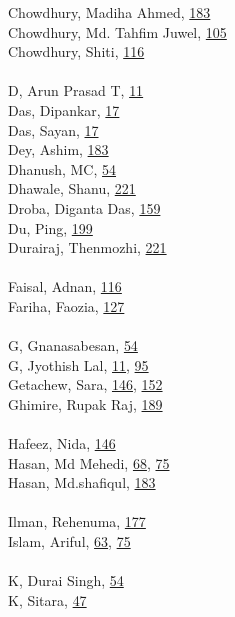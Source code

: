 \documentclass[11pt,oneside]{book}
\begin{document}
\begin{multicols}{2}
Chowdhury, Madiha Ahmed, \hyperlink{page.183}{183}\\
Chowdhury, Md. Tahfim Juwel, \hyperlink{page.105}{105}\\
Chowdhury, Shiti, \hyperlink{page.116}{116}\\
\\ %
D, Arun Prasad T, \hyperlink{page.11}{11}\\
Das, Dipankar, \hyperlink{page.17}{17}\\
Das, Sayan, \hyperlink{page.17}{17}\\
Dey, Ashim, \hyperlink{page.183}{183}\\
Dhanush, MC, \hyperlink{page.54}{54}\\
Dhawale, Shanu, \hyperlink{page.221}{221}\\
Droba, Diganta Das, \hyperlink{page.159}{159}\\
Du, Ping, \hyperlink{page.199}{199}\\
Durairaj, Thenmozhi, \hyperlink{page.221}{221}\\
\\ %
Faisal, Adnan, \hyperlink{page.116}{116}\\
Fariha, Faozia, \hyperlink{page.127}{127}\\
\\ %
G, Gnanasabesan, \hyperlink{page.54}{54}\\
G, Jyothish Lal, \hyperlink{page.11}{11}, \hyperlink{page.95}{95}\\
Getachew, Sara, \hyperlink{page.146}{146}, \hyperlink{page.152}{152}\\
Ghimire, Rupak Raj, \hyperlink{page.189}{189}\\
\\ %
Hafeez, Nida, \hyperlink{page.146}{146}\\
Hasan, Md Mehedi, \hyperlink{page.68}{68}, \hyperlink{page.75}{75}\\
Hasan, Md.shafiqul, \hyperlink{page.183}{183}\\
\\ %
Ilman, Rehenuma, \hyperlink{page.177}{177}\\
Islam, Ariful, \hyperlink{page.63}{63}, \hyperlink{page.75}{75}\\
\\ %
K, Durai Singh, \hyperlink{page.54}{54}\\
K, Sitara, \hyperlink{page.47}{47}\\

\end{multicols}
\end{document}

